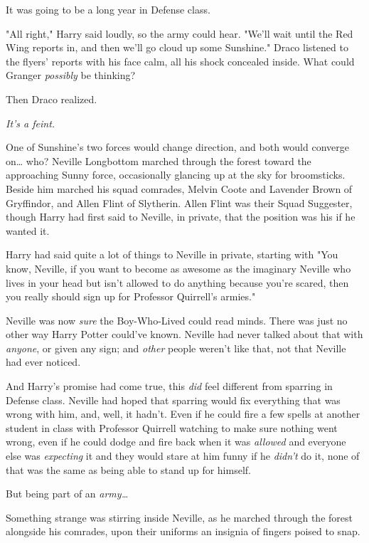 It was going to be a long year in Defense class.

"All right," Harry said loudly, so the army could hear. "We'll wait until the
Red Wing reports in, and then we'll go cloud up some Sunshine."
\sbreak
Draco listened to the flyers' reports with his face calm, all his shock
concealed inside. What could Granger \emph{possibly} be thinking?

Then Draco realized.

\emph{It's a feint.}

One of Sunshine's two forces would change direction, and both would converge
on{\ldots} who?
\sbreak
Neville Longbottom marched through the forest toward the approaching Sunny
force, occasionally glancing up at the sky for broomsticks. Beside him marched
his squad comrades, Melvin Coote and Lavender Brown of Gryffindor, and Allen
Flint of Slytherin. Allen Flint was their Squad Suggester, though Harry had
first said to Neville, in private, that the position was his if he wanted it.

Harry had said quite a lot of things to Neville in private, starting with "You
know, Neville, if you want to become as awesome as the imaginary Neville who
lives in your head but isn't allowed to do anything because you're scared, then
you really should sign up for Professor Quirrell's armies."

Neville was now \emph{sure} the Boy-Who-Lived could read minds. There was just
no other way Harry Potter could've known. Neville had never talked about that
with \emph{anyone}, or given any sign; and \emph{other} people weren't like
that, not that Neville had ever noticed.

And Harry's promise had come true, this \emph{did} feel different from sparring
in Defense class. Neville had hoped that sparring would fix everything that was
wrong with him, and, well, it hadn't. Even if he could fire a few spells at
another student in class with Professor Quirrell watching to make sure nothing
went wrong, even if he could dodge and fire back when it was \emph{allowed} and
everyone else was \emph{expecting} it and they would stare at him funny if he
\emph{didn't} do it, none of that was the same as being able to stand up for
himself.

But being part of an \emph{army{\ldots}}

Something strange was stirring inside Neville, as he marched through the forest
alongside his comrades, upon their uniforms an insignia of fingers poised to
snap.

